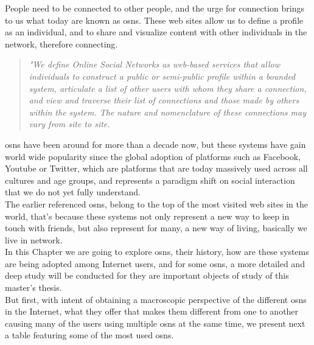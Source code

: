 People need to be connected to other people, and the urge for connection brings to us what today are known as \glspl{osn}.
These web sites allow us to define a profile as an individual, and to share and visualize content with other individuals in the network, therefore connecting.

\begin{quote}
\textit{"We define Online Social Networks as web-based services that allow individuals to construct a public or semi-public
 profile within a bounded system, articulate a list of other users with whom they share a connection, and view and traverse
 their list of connections and those made by others within the system. The nature and nomenclature of these connections
 may vary from site to site.} \citep{ellison2007social}
\end{quote}

\indent \glspl{osn} have been around for more than a decade now, but these systems have gain world wide popularity since the global adoption of
platforms such as Facebook, Youtube or Twitter, which are platforms that are today massively used across all cultures and age groups, and represents
a paradigm shift on social interaction that we do not yet fully understand.\\
\indent The earlier referenced \glspl{osn}, belong to the top of the most visited web sites in the world, that's because these systems not only represent a new
way to keep in touch with friends, but also represent for many, a new way of living, basically we live in network.\\
\indent In this Chapter we are going to explore \glspl{osn}, their history, how are these systems are being adopted among Internet users, and for some \glspl{osn},
a more detailed and deep study will be conducted for they are important objects of study of this master's thesis.\\
\indent But first, with intent of obtaining a macroscopic perspective of the different \glspl{osn} in the Internet, what they offer
that makes them different from one to another causing many of the users using multiple \glspl{osn} at the same time, we present next a table featuring some
of the most used \glspl{osn}.
